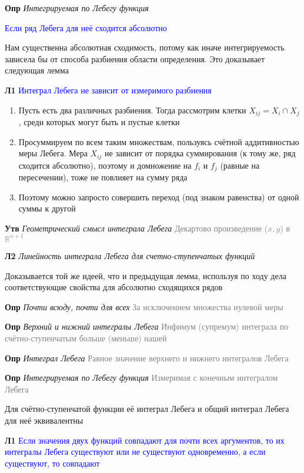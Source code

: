 \textbf{Опр} \textit{Интегрируемая по Лебегу функция}

\textcolor{blue}{Если ряд Лебега для неё сходится абсолютно}

Нам существенна абсолютная сходимость, потому как иначе интегрируемость зависела бы от способа разбиения области
определения.
Это доказывает следующая лемма

\textbf{Л1} \textcolor{blue}{Интеграл Лебега не зависит от измеримого разбиения}

\begin{enumerate}
    \item Пусть есть два различных разбиения.
    Тогда рассмотрим клетки $X_{ij} = X_{i} \cap X_{j}$, среди которых могут быть и пустые клетки
    \item Просуммируем по всем таким множествам, пользуясь счётной аддитивностью меры Лебега.
    Мера $X_{ij}$ не зависит от порядка суммирования (к тому же, ряд сходится абсолютно), поэтому и домножение на $
    f_i$ и $f_j$ (равные на пересечении), тоже не повлияет на сумму ряда
    \item Поэтому можно запросто совершить переход (под знаком равенства) от одной суммы к другой
\end{enumerate}

\textbf{Утв} \textit{Геометрический смысл интеграла Лебега} \textcolor{gray}{Декартово произведение ($x, y$) в
    $\mathbb{R}^{n+1}$}

\textbf{Л2} \textit{Линейность интеграла Лебега для счетно-ступенчатых функций}

Доказывается той же идеей, что и предыдущая лемма, используя по ходу дела соответствующие свойства для абсолютно
сходящихся рядов

\textbf{Опр} \textit{Почти всюду, почти для всех} \textcolor{gray}{За исключением множества нулевой меры}

\textbf{Опр} \textit{Верхний и нижний интегралы Лебега} \textcolor{gray}{Инфимум (супремум) интеграла по
счётно-ступенчатым больше (меньше) нашей}

\textbf{Опр} \textit{Интеграл Лебега} \textcolor{gray}{Равное значение верхнего и нижнего интегралов Лебега}

\textbf{Опр} \textit{Интегрируемая по Лебегу функция} \textcolor{gray}{Измеримая с конечным интегралом Лебега}

Для счётно-ступенчатой функции её интеграл Лебега и общий интеграл Лебега для неё эквивалентны

\textbf{Л1} \textcolor{blue}{Если значения двух функций совпадают для почти всех аргументов, то их интегралы Лебега
существуют или не существуют одновременно, а если существуют, то совпадают}

